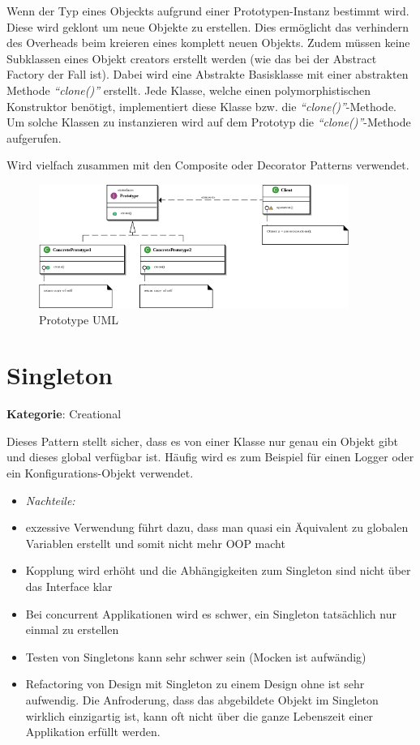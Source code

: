 Wenn der Typ eines Objeckts aufgrund einer Prototypen-Instanz bestimmt wird. Diese wird geklont um neue Objekte zu erstellen. Dies ermöglicht das verhindern des Overheads beim kreieren eines komplett neuen Objekts. Zudem müssen keine Subklassen eines Objekt creators erstellt werden (wie das bei der Abstract Factory der Fall ist).
Dabei wird eine Abstrakte Basisklasse mit einer abstrakten Methode \textit{``clone()''} erstellt. Jede Klasse, welche einen polymorphistischen Konstruktor benötigt, implementiert diese Klasse bzw. die \textit{``clone()''}-Methode.
Um solche Klassen zu instanzieren wird auf dem Prototyp die \textit{``clone()''}-Methode aufgerufen.

Wird vielfach zusammen mit den Composite oder Decorator Patterns verwendet.

\begin{figure}[H]
	\centering
	\includegraphics[width=0.9\textwidth]{content/gof/images/02-prototype-uml.png}
	\caption{Prototype UML}
\end{figure}


\section{Singleton}
\textbf{Kategorie}: Creational

Dieses Pattern stellt sicher, dass es von einer Klasse nur genau ein Objekt gibt und dieses global verfügbar ist.
Häufig wird es zum Beispiel für einen Logger oder ein Konfigurations-Objekt verwendet.

\begin{itemize}
	\item \textit{Nachteile:}
	\item exzessive Verwendung führt dazu, dass man quasi ein Äquivalent zu globalen Variablen erstellt und somit nicht mehr OOP macht
	\item Kopplung wird erhöht und die Abhängigkeiten zum Singleton sind nicht über das Interface klar
	\item Bei concurrent Applikationen wird es schwer, ein Singleton tatsächlich nur einmal zu erstellen
	\item Testen von Singletons kann sehr schwer sein (Mocken ist aufwändig)
	\item Refactoring von Design mit Singleton zu einem Design ohne ist sehr aufwendig. Die Anfroderung, dass das abgebildete Objekt im Singleton wirklich einzigartig ist, kann oft nicht über die ganze Lebenszeit einer Applikation erfüllt werden.
\end{itemize}

